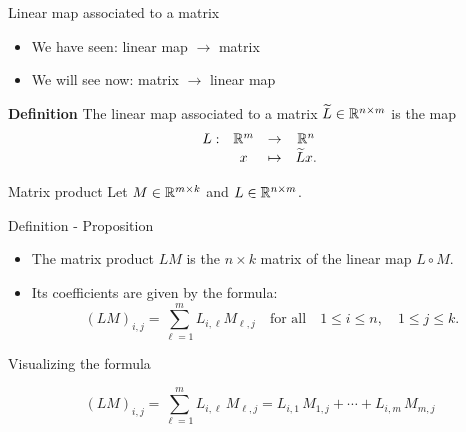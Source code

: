 \documentclass{beamer}
\begin{document}
\begin{frame}[t]{Linear map associated to a matrix}
	\begin{itemize}
		\item We have seen: \quad linear map $\to$ matrix
		\item We will see now: \quad matrix $\to$ linear map
	\end{itemize}

	\vspace{0.1cm}
	\begin{block}{\bf Definition}
		The linear map associated to a matrix $\widetilde{L} \in \mathbb{R}^{n \times m}$ is the map
		$$
		\begin{array}{cccc}
			L:& \mathbb{R}^m & \to & \mathbb{R}^n \\
			  & x & \mapsto & \widetilde{L}x.
		\end{array}
		$$
		\vspace{-0.5cm}
	\end{block}
\end{frame}

\begin{frame}[t]{Matrix product}
	Let $M \in \mathbb{R}^{m \times k}$ and $L \in \mathbb{R}^{n \times m}$. 
	\vspace{1.5cm}
	\begin{block}{Definition - Proposition}
		\begin{itemize}
			\item The matrix product $LM$ is the $n \times k$ matrix of the linear map $L \circ M$.
				\vspace{0.1cm}
			\item Its coefficients are given by the formula:
		\vspace{-0.2cm}
				$$
				(LM)_{i,j} = \sum_{\ell=1}^m L_{i,\ell} M_{\ell,j} \quad \text{for all} \quad 1 \leq i \leq n, \quad 1 \leq j \leq k.
				$$
		\end{itemize}
		\vspace{-0.4cm}
	\end{block}
\end{frame}
\begin{frame}[t]{Visualizing the formula}
	\vspace{-0.9cm}
	\begin{exampleblock}{}
		\vspace{-0.4cm}
		$$
		(LM)_{i,j} = \sum_{\ell=1}^m L_{i,\ell} \, M_{\ell,j} 
		= L_{i,1} \, M_{1,j} + \cdots + L_{i,m} \, M_{m,j} 
		$$
		\vspace{-0.3cm}
	\end{exampleblock}
\end{frame}
\end{document}
